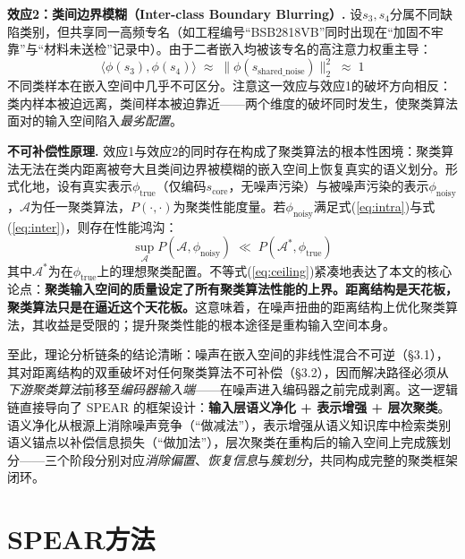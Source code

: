 \documentclass[10.5pt,compsoc,UTF8]{CjC}
\theoremstyle{mystyle}
\begin{document}
\textbf{效应2：类间边界模糊（Inter-class Boundary Blurring）.} 设$s_3, s_4$分属不同缺陷类别，但共享同一高频专名（如工程编号``BSB2818VB''同时出现在``加固不牢靠''与``材料未送检''记录中）。由于二者嵌入均被该专名的高注意力权重主导：
\begin{equation}
\langle \phi(s_3), \phi(s_4) \rangle \;\approx\; \|\phi(s_{\text{shared\_noise}})\|_2^2 \;\approx\; 1
\label{eq:inter}
\end{equation}
不同类样本在嵌入空间中几乎不可区分。注意这一效应与效应1的破坏方向相反：类内样本被迫远离，类间样本被迫靠近——两个维度的破坏同时发生，使聚类算法面对的输入空间陷入\emph{最劣配置}。

\textbf{不可补偿性原理.} 效应1与效应2的同时存在构成了聚类算法的根本性困境：聚类算法无法在类内距离被夸大且类间边界被模糊的嵌入空间上恢复真实的语义划分。形式化地，设有真实表示$\phi_{\text{true}}$（仅编码$s_{\text{core}}$，无噪声污染）与被噪声污染的表示$\phi_{\text{noisy}}$，$\mathcal{A}$为任一聚类算法，$P(\cdot,\cdot)$为聚类性能度量。若$\phi_{\text{noisy}}$满足式(\ref{eq:intra})与式(\ref{eq:inter})，则存在性能鸿沟：
\begin{equation}
\sup_{\mathcal{A}} P(\mathcal{A}, \phi_{\text{noisy}}) \;\ll\; P(\mathcal{A}^*, \phi_{\text{true}})
\label{eq:ceiling}
\end{equation}
其中$\mathcal{A}^*$为在$\phi_{\text{true}}$上的理想聚类配置。不等式(\ref{eq:ceiling})紧凑地表达了本文的核心论点：\textbf{聚类输入空间的质量设定了所有聚类算法性能的上界。距离结构是天花板，聚类算法只是在逼近这个天花板。}这意味着，在噪声扭曲的距离结构上优化聚类算法，其收益是受限的；提升聚类性能的根本途径是重构输入空间本身。

至此，理论分析链条的结论清晰：噪声在嵌入空间的非线性混合不可逆（\S 3.1），其对距离结构的双重破坏对任何聚类算法不可补偿（\S 3.2），因而解决路径必须从\emph{下游聚类算法}前移至\emph{编码器输入端}——在噪声进入编码器之前完成剥离。这一逻辑链直接导向了 SPEAR 的框架设计：\textbf{输入层语义净化 + 表示增强 + 层次聚类}。语义净化从根源上消除噪声竞争（``做减法''），表示增强从语义知识库中检索类别语义锚点以补偿信息损失（``做加法''），层次聚类在重构后的输入空间上完成簇划分——三个阶段分别对应\emph{消除偏置}、\emph{恢复信息}与\emph{簇划分}，共同构成完整的聚类框架闭环。

\section{\heiti SPEAR方法}
\label{sec:method}
\end{document}
